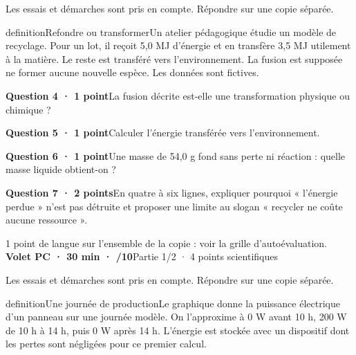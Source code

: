 \par\vspace{2mm}Les essais et démarches sont pris en compte. Répondre sur une copie séparée.\par
\begin{pcEncadre}{definition}{Refondre ou transformer}Un atelier pédagogique étudie un modèle de recyclage. Pour un lot, il reçoit 5,0 MJ d’énergie et en transfère 3,5 MJ utilement à la matière. Le reste est transféré vers l’environnement. La fusion est supposée ne former aucune nouvelle espèce. Les données sont fictives.\end{pcEncadre}
\par\addvspace{3mm}\noindent\textbf{Question 4 · 1 point}\quad La fusion décrite est-elle une transformation physique ou chimique ?\par
\par\addvspace{3mm}\noindent\textbf{Question 5 · 1 point}\quad Calculer l’énergie transférée vers l’environnement.\par
\par\addvspace{3mm}\noindent\textbf{Question 6 · 1 point}\quad Une masse de 54,0 g fond sans perte ni réaction : quelle masse liquide obtient-on ?\par
\par\addvspace{3mm}\noindent\textbf{Question 7 · 2 points}\quad En quatre à six lignes, expliquer pourquoi « l’énergie perdue » n’est pas détruite et proposer une limite au slogan « recycler ne coûte aucune ressource ».\par
\vfill{}
{\small 1 point de langue sur l’ensemble de la copie : voir la grille d’autoévaluation.}
\label{bb-8}
\noindent\textbf{Volet PC · 30 min · /10}\hfill Partie 1/2 · 4 points scientifiques
\par\vspace{2mm}Les essais et démarches sont pris en compte. Répondre sur une copie séparée.\par
\begin{pcEncadre}{definition}{Une journée de production}Le graphique donne la puissance électrique d’un panneau sur une journée modèle. On l’approxime à 0 W avant 10 h, 200 W de 10 h à 14 h, puis 0 W après 14 h. L’énergie est stockée avec un dispositif dont les pertes sont négligées pour ce premier calcul.\end{pcEncadre}
